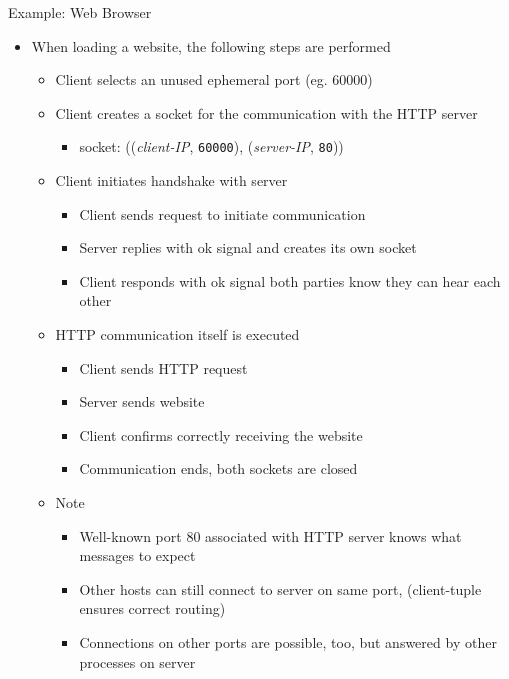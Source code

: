 \begin{frame}{Example: Web Browser}
%
\begin{itemize}
\item When loading a website, the following steps are performed
	\begin{itemize}
	\item Client selects an unused ephemeral port (eg. 60000)
	\item Client creates a socket for the communication with the HTTP server
		\begin{itemize}
		\item socket: ((\emph{client-IP}, \texttt{60000}), (\emph{server-IP}, \texttt{80}))
		\end{itemize}
\pause
	\item Client initiates handshake with server
		\begin{itemize}
		\item Client sends request to initiate communication
		\item Server replies with ok signal and creates its own socket
		\item Client responds with ok signal \Thus both parties know they can hear each other
		\end{itemize}
\pause
	\item HTTP communication itself is executed
		\begin{itemize}
		\item Client sends HTTP request
		\item Server sends website
		\item Client confirms correctly receiving the website
		\item Communication ends, both sockets are closed
		\end{itemize}
\pause
	\item Note
		\begin{itemize}
		\item Well-known port 80 associated with HTTP \Thus server knows what messages to expect
		\item Other hosts can still connect to server on same port, (client-tuple ensures correct routing)
		\item Connections on other ports are possible, too, but answered by other processes on server
		\end{itemize}
	\end{itemize}
\end{itemize}
%
\end{frame}

